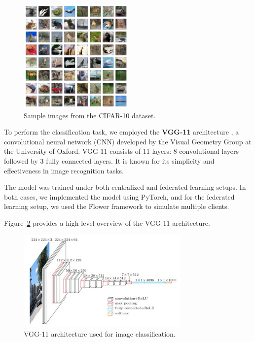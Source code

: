 \documentclass[11pt]{article}
\begin{document}
    \begin{figure}[h]
        \centering
        \includegraphics[width=0.5\textwidth]{img/cifar10_samples}
        \caption{Sample images from the CIFAR-10 dataset.}
        \label{fig:cifar10}
    \end{figure}

    To perform the classification task, we employed the \textbf{VGG-11} architecture \cite{Simonyan2014VeryDC}, a convolutional neural network (CNN) developed by the Visual Geometry Group at the University of Oxford.
    VGG-11 consists of 11 layers: 8 convolutional layers followed by 3 fully connected layers.
    It is known for its simplicity and effectiveness in image recognition tasks.

    The model was trained under both centralized and federated learning setups.
    In both cases, we implemented the model using PyTorch, and for the federated learning setup, we used the Flower framework \cite{beutel2020flower} to simulate multiple clients.

    Figure~\ref{fig:vgg11} provides a high-level overview of the VGG-11 architecture.

    \begin{figure}[h]
        \centering
        \includegraphics[width=0.75\textwidth]{img/vgg11_diagram}
        \caption{VGG-11 architecture used for image classification.}
        \label{fig:vgg11}
    \end{figure}
\end{document}
